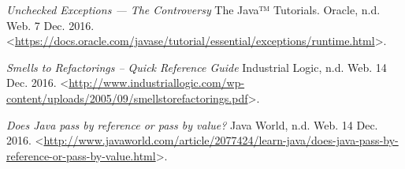 \begin{thebibliography}{9}

\textit{Unchecked Exceptions — The Controversy} The Java™ Tutorials. Oracle, n.d. Web. 7 Dec. 2016. <\url{https://docs.oracle.com/javase/tutorial/essential/exceptions/runtime.html}>.



\textit{Smells to Refactorings -- Quick Reference Guide} Industrial Logic, n.d. Web. 14 Dec. 2016. <\url{http://www.industriallogic.com/wp-content/uploads/2005/09/smellstorefactorings.pdf}>.


\textit{Does Java pass by reference or pass by value?} Java World, n.d. Web. 14 Dec. 2016. <\url{http://www.javaworld.com/article/2077424/learn-java/does-java-pass-by-reference-or-pass-by-value.html}>.



\end{thebibliography}